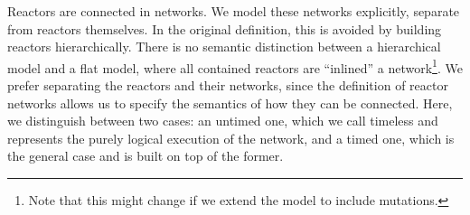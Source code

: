 %

Reactors are connected in networks. We model these networks explicitly, separate from reactors themselves.
In the original definition, this is avoided by building reactors hierarchically.
There is no semantic distinction between a hierarchical model and a flat model, where all contained reactors are ``inlined'' a network\footnote{Note
 that this might change if we extend the model to include mutations.}.
We prefer separating the reactors and their networks, since the definition of reactor networks allows us to specify the semantics of how they can be connected.
Here, we distinguish between two cases: an untimed one, which we call timeless and represents the purely logical execution of the network,
and a timed one, which is the general case and is built on top of the former.

